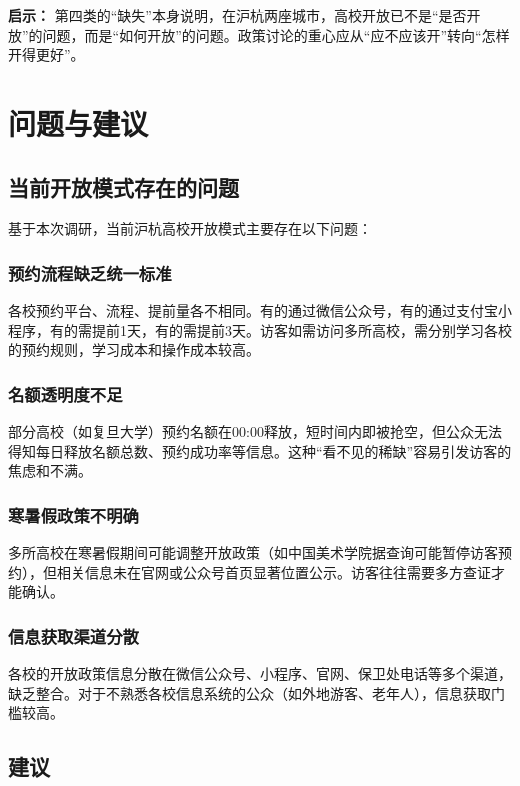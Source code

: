 \documentclass[12pt]{article}
\begin{document}
\textbf{启示：} 第四类的“缺失”本身说明，在沪杭两座城市，高校开放已不是“是否开放”的问题，而是“如何开放”的问题。政策讨论的重心应从“应不应该开”转向“怎样开得更好”。


\section{问题与建议}

\subsection{当前开放模式存在的问题}

基于本次调研，当前沪杭高校开放模式主要存在以下问题：

\subsubsection{预约流程缺乏统一标准}

各校预约平台、流程、提前量各不相同。有的通过微信公众号，有的通过支付宝小程序，有的需提前1天，有的需提前3天。访客如需访问多所高校，需分别学习各校的预约规则，学习成本和操作成本较高。

\subsubsection{名额透明度不足}

部分高校（如复旦大学）预约名额在00:00释放，短时间内即被抢空，但公众无法得知每日释放名额总数、预约成功率等信息。这种“看不见的稀缺”容易引发访客的焦虑和不满。

\subsubsection{寒暑假政策不明确}

多所高校在寒暑假期间可能调整开放政策（如中国美术学院据查询可能暂停访客预约），但相关信息未在官网或公众号首页显著位置公示。访客往往需要多方查证才能确认。

\subsubsection{信息获取渠道分散}

各校的开放政策信息分散在微信公众号、小程序、官网、保卫处电话等多个渠道，缺乏整合。对于不熟悉各校信息系统的公众（如外地游客、老年人），信息获取门槛较高。

\subsection{建议}
\end{document}
